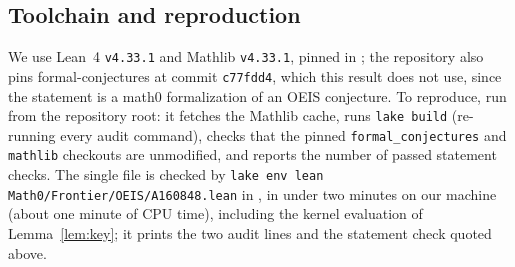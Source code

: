 \documentclass[11pt]{amsart}
\theoremstyle{plain}
\theoremstyle{definition}
\begin{document}
\subsection*{Toolchain and reproduction}
We use Lean~4 \cite{Lean4} \texttt{v4.33.1} and Mathlib \cite{Mathlib} \texttt{v4.33.1}, pinned in ; the repository also pins formal-conjectures \cite{FC} at commit \texttt{c77fdd4}, which this result does not use, since the statement is a math0 formalization of an OEIS conjecture. To reproduce, run  from the repository root: it fetches the Mathlib cache, runs \texttt{lake build} (re-running every audit command), checks that the pinned \texttt{formal\_conjectures} and \texttt{mathlib} checkouts are unmodified, and reports the number of passed statement checks. The single file is checked by \texttt{lake env lean Math0/Frontier/OEIS/A160848.lean} in , in under two minutes on our machine (about one minute of CPU time), including the kernel evaluation of Lemma~\ref{lem:key}; it prints the two audit lines and the statement check quoted above.
\end{document}
